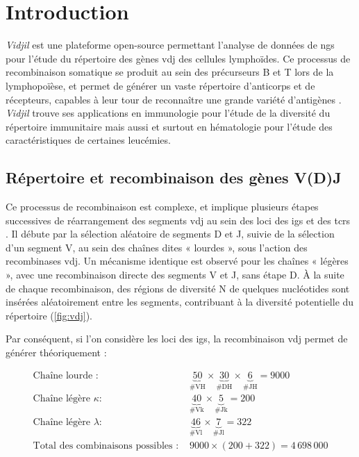\chapter{Introduction}

\textit{Vidjil} est une plateforme open-source \cite{giraudFastMulticlonalClusterization2014b}
permettant l'analyse de données de \gls{ngs} pour l'étude du répertoire des gènes \gls{vdj} des 
cellules lymphoïdes. Ce processus de recombinaison somatique se produit au sein des précurseurs
B et T lors de la lymphopoïèse, et permet de générer un vaste répertoire d'anticorps et de récepteurs,
capables à leur tour de reconnaître une grande variété d'antigènes \cite{jonesTamingTransposonVDJ2004}. 
\textit{Vidjil} trouve ses applications en immunologie pour l'étude de la diversité du répertoire immunitaire 
mais aussi et surtout en hématologie pour l'étude des caractéristiques de certaines leucémies.

\section{Répertoire et recombinaison des gènes V(D)J}

Ce processus de recombinaison est complexe, et implique plusieurs étapes successives de réarrangement des segments
\gls{vdj} au sein des loci des \glspl{ig} et des \glspl{tcr} \cite{rothVDJRecombinationMechanism2014}.
Il débute par la sélection aléatoire de segments D et J, suivie de la sélection d'un segment V, au sein des chaînes
dites « lourdes », sous l'action des recombinases \gls{vdj}. Un mécanisme identique est observé pour les chaînes « légères »,
avec une recombinaison directe des segments V et J, sans étape D. À la suite de chaque recombinaison, des régions de diversité N 
de quelques nucléotides sont insérées aléatoirement entre les segments, contribuant à la diversité potentielle du répertoire 
(\autoref{fig:vdj}).

\vspace{1em}

Par conséquent, si l'on considère les loci des \glspl{ig}, la recombinaison \gls{vdj} permet de générer théoriquement : 

\begin{examplebox}[label={ex:combinaisons}]
    \begin{equation}
        \begin{aligned}
        \text{Chaîne lourde : } & \underbrace{50}_{\text{\# VH}} \times \underbrace{30}_{\text{\# DH}} \times \underbrace{6}_{\text{\# JH}} = 9000 \\
        \text{Chaîne légère } \kappa : & \underbrace{40}_{\text{\# Vk}} \times \underbrace{5}_{\text{\# Jk}} = 200 \\
        \text{Chaîne légère } \lambda : & \underbrace{46}_{\text{\# Vl}} \times \underbrace{7}_{\text{\# Jl}} = 322 \\
        \text{Total des combinaisons possibles : } & 9000 \times (200 + 322) = 4\,698\,000
        \end{aligned}
    \end{equation}
\end{examplebox}

